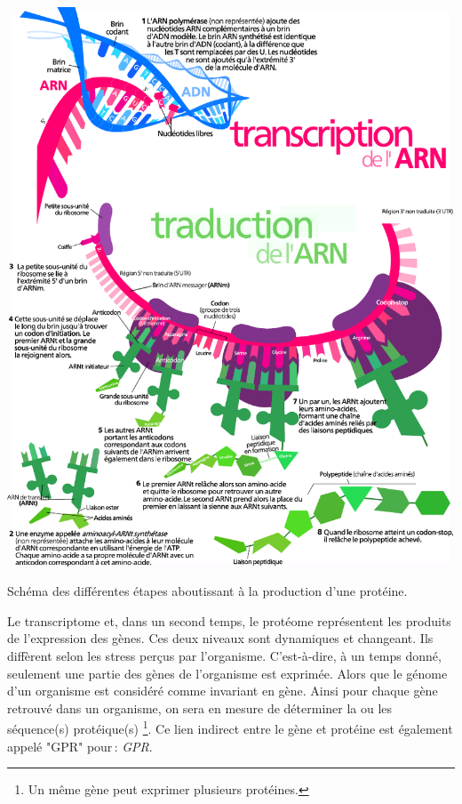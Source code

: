 \begin{refsegment}
    \begin{shadedfigure}
        \centering
        \includegraphics[width=\textwidth]{img/production_proteine2.pdf}
        \caption{Schéma des différentes étapes aboutissant à la production d’une protéine.}
        \label{fig:production_proteine}
    \end{shadedfigure}
    
    Le transcriptome et, dans un second temps, le protéome représentent les produits de l'expression des gènes. Ces deux niveaux sont dynamiques et changeant. Ils diffèrent selon les stress perçus par l'organisme. C'est-à-dire, à un temps donné, seulement une partie des gènes de l'organisme est exprimée. Alors que le génome d'un organisme est considéré comme invariant en gène. Ainsi pour chaque gène retrouvé dans un organisme, on sera en mesure de déterminer la ou les séquence(s) protéique(s) \footnote{Un même gène peut exprimer plusieurs protéines.}. Ce lien indirect entre le gène et protéine est également appelé "\acrshort{GPR}" pour : \textit{\acrfull{GPR}}.
    

\end{refsegment}

